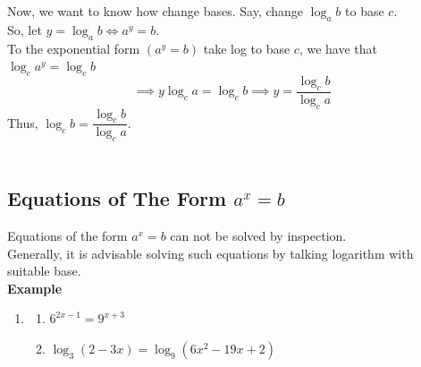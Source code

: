 \documentclass[11pt,a4paper]{article}
\begin{document}
Now, we want to know how change bases. Say, change $\log_{\displaystyle{a}}b$ to base $c$.\\
So, let $y=\log_{\displaystyle{a}}b\iff a^{\displaystyle{y}}=b$.\\

To the exponential form $(a^{\displaystyle{y}}=b)$ take log to base $c$, we have that $\log_{\displaystyle{c}}a^{\displaystyle{y}} =\log_{\displaystyle{c}}b$
$$\implies y\log_{\displaystyle{c}}a=\log_{\displaystyle{c}}b\implies y=\frac{\log_{\displaystyle{c}}b}{\log_{\displaystyle{c}}a}$$
Thus, $\log_{\displaystyle{c}}b=\dfrac{\log_{\displaystyle{c}}b}{\log_{\displaystyle{c}}a}$.\\\\













\subsection{Equations of The Form $a^x=b$}
Equations of the form $a^{\displaystyle{x}}=b$ can not be solved by inspection.\\

Generally, it is advisable solving such equations  by talking logarithm with suitable base.\\

\textbf{Example}
\begin{enumerate}
\item[]
\begin{enumerate}
       \item $6^{\displaystyle{2x-1}}=9^{\displaystyle{x+3}}$
       \item $\log_{\displaystyle{3}}(2-3x)=\log_{\displaystyle{9}}(6x^{\displaystyle{2}}-19x+2)$
\end{enumerate}
\end{enumerate}
\end{document}
